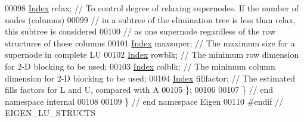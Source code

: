 \begin{DoxyCode}
00098   \hyperlink{namespace_eigen_a62e77e0933482dafde8fe197d9a2cfde}{Index} relax; \textcolor{comment}{// To control degree of relaxing supernodes. If the number of nodes (columns) }
00099                 \textcolor{comment}{// in a subtree of the elimination tree is less than relax, this subtree is considered }
00100                 \textcolor{comment}{// as one supernode regardless of the row structures of those columns}
00101   \hyperlink{namespace_eigen_a62e77e0933482dafde8fe197d9a2cfde}{Index} maxsuper; \textcolor{comment}{// The maximum size for a supernode in complete LU}
00102   \hyperlink{namespace_eigen_a62e77e0933482dafde8fe197d9a2cfde}{Index} rowblk; \textcolor{comment}{// The minimum row dimension for 2-D blocking to be used;}
00103   \hyperlink{namespace_eigen_a62e77e0933482dafde8fe197d9a2cfde}{Index} colblk; \textcolor{comment}{// The minimum column dimension for 2-D blocking to be used;}
00104   \hyperlink{namespace_eigen_a62e77e0933482dafde8fe197d9a2cfde}{Index} fillfactor; \textcolor{comment}{// The estimated fills factors for L and U, compared with A}
00105 \}; 
00106 
00107 \} \textcolor{comment}{// end namespace internal}
00108 
00109 \} \textcolor{comment}{// end namespace Eigen}
00110 \textcolor{preprocessor}{#endif // EIGEN\_LU\_STRUCTS}
\end{DoxyCode}
